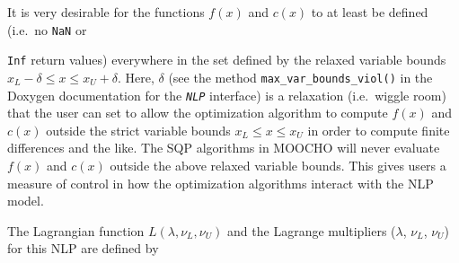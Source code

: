 \documentclass[pdf,ps2pdf,11pt]{SANDreport}
\begin{document}
It is very desirable for the functions $f(x)$ and $c(x)$ to at least be
defined (i.e.\ no {}\texttt{NaN} or {\texttt{Inf} return values) everywhere in
the set defined by the relaxed variable bounds $x_L - \delta \leq x \leq x_U +
\delta$.  Here, $\delta$ (see the method
\texttt{max\_var\_bounds\_viol()} in the Doxygen documentation for the
\texttt{\textit{NLP}} interface) is a relaxation (i.e.\ wiggle room)
that the user can set to allow the optimization algorithm to compute
$f(x)$ and $c(x)$ outside the strict variable bounds $x_L \le x \le
x_U$ in order to compute finite differences and the like.  The SQP
algorithms in MOOCHO will never evaluate $f(x)$ and $c(x)$ outside the
above relaxed variable bounds.  This gives users a measure of control
in how the optimization algorithms interact with the NLP model.

%
%

The Lagrangian function $L(\lambda, \nu_L, \nu_U)$ and the Lagrange multipliers ($\lambda$, $\nu_L$, $\nu_U$) for this
NLP are defined by

}
\end{document}
